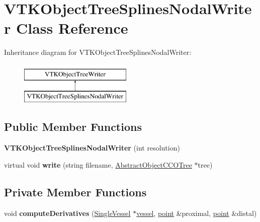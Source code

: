 \hypertarget{class_v_t_k_object_tree_splines_nodal_writer}{}\section{V\+T\+K\+Object\+Tree\+Splines\+Nodal\+Writer Class Reference}
\label{class_v_t_k_object_tree_splines_nodal_writer}
Inheritance diagram for V\+T\+K\+Object\+Tree\+Splines\+Nodal\+Writer\+:\begin{figure}[H]
\begin{center}
\leavevmode
\includegraphics[height=2.000000cm]{d3/d66/class_v_t_k_object_tree_splines_nodal_writer}
\end{center}
\end{figure}
\subsection*{Public Member Functions}
\begin{DoxyCompactItemize}
\item 
{\bfseries V\+T\+K\+Object\+Tree\+Splines\+Nodal\+Writer} (int resolution)\hypertarget{class_v_t_k_object_tree_splines_nodal_writer_a0b19d48b7adcfbe4f54636b0e6f66acd}{}\label{class_v_t_k_object_tree_splines_nodal_writer_a0b19d48b7adcfbe4f54636b0e6f66acd}

\item 
virtual void {\bfseries write} (string filename, \hyperlink{class_abstract_object_c_c_o_tree}{Abstract\+Object\+C\+C\+O\+Tree} $\ast$tree)\hypertarget{class_v_t_k_object_tree_splines_nodal_writer_a1c4404476233f13e8d778936b7e5b816}{}\label{class_v_t_k_object_tree_splines_nodal_writer_a1c4404476233f13e8d778936b7e5b816}

\end{DoxyCompactItemize}
\subsection*{Private Member Functions}
\begin{DoxyCompactItemize}
\item 
void {\bfseries compute\+Derivatives} (\hyperlink{class_single_vessel}{Single\+Vessel} $\ast$\hyperlink{structvessel}{vessel}, \hyperlink{structpoint}{point} \&proximal, \hyperlink{structpoint}{point} \&distal)\hypertarget{class_v_t_k_object_tree_splines_nodal_writer_ad8face2e1cf29239e57c3e7890ec5dc1}{}\label{class_v_t_k_object_tree_splines_nodal_writer_ad8face2e1cf29239e57c3e7890ec5dc1}

\end{DoxyCompactItemize}
